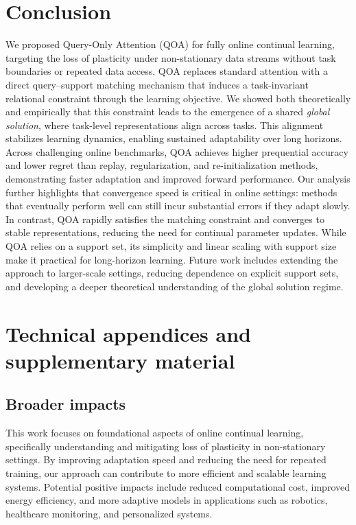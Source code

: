 \documentclass{article}
\begin{document}
\section{Conclusion}
\label{sec:conclusion}
We proposed Query-Only Attention (QOA) for fully online continual learning, targeting the loss of plasticity under non-stationary data streams without task boundaries or repeated data access. QOA replaces standard attention with a direct query–support matching mechanism that induces a task-invariant relational constraint through the learning objective.
We showed both theoretically and empirically that this constraint leads to the emergence of a shared \emph{global solution}, where task-level representations align across tasks. This alignment stabilizes learning dynamics, enabling sustained adaptability over long horizons. Across challenging online benchmarks, QOA achieves higher prequential accuracy and lower regret than replay, regularization, and re-initialization methods, demonstrating faster adaptation and improved forward performance.
Our analysis further highlights that convergence speed is critical in online settings: methods that eventually perform well can still incur substantial errors if they adapt slowly. In contrast, QOA rapidly satisfies the matching constraint and converges to stable representations, reducing the need for continual parameter updates.
While QOA relies on a support set, its simplicity and linear scaling with support size make it practical for long-horizon learning. Future work includes extending the approach to larger-scale settings, reducing dependence on explicit support sets, and developing a deeper theoretical understanding of the global solution regime.





\appendix

\section{Technical appendices and supplementary material}
\subsection{Broader impacts}
\label{sec:broader_impacts}
This work focuses on foundational aspects of online continual learning, specifically understanding and mitigating loss of plasticity in non-stationary settings. By improving adaptation speed and reducing the need for repeated training, our approach can contribute to more efficient and scalable learning systems. Potential positive impacts include reduced computational cost, improved energy efficiency, and more adaptive models in applications such as robotics, healthcare monitoring, and personalized systems.
\end{document}
